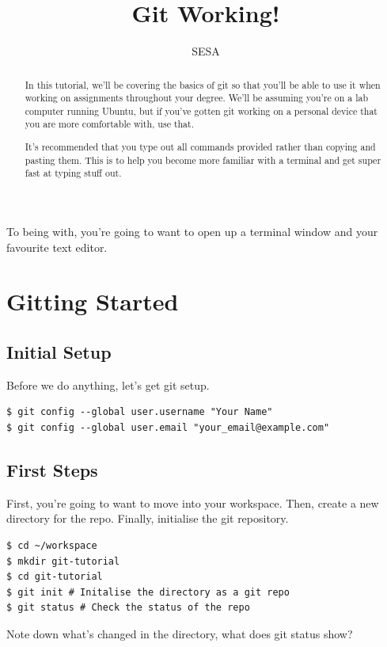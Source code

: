 \documentclass{tufte-handout}
\title{Git Working!}
\author{SESA}
\begin{document}
\maketitle

\begin{abstract}
\noindent In this tutorial, we'll be covering the basics of git so that you'll
be able to use it when working on assignments throughout your degree. We'll be
assuming you're on a lab computer running Ubuntu, but if you've gotten git 
working on a personal device that you are more comfortable with, use that.

\noindent It's recommended that you type out all commands provided rather than copying
and pasting them. This is to help you become more familiar with a terminal and
get super fast at typing stuff out.
\end{abstract}

\noindent To being with, you're going to want to open up a terminal window and your
favourite text editor.

\section{Gitting Started}
\subsection{Initial Setup}

Before we do anything, let's get git setup.

\begin{lstlisting}
$ git config --global user.username "Your Name"
$ git config --global user.email "your_email@example.com"
\end{lstlisting}

\subsection{First Steps}

First, you're going to want to move into your workspace. Then, create a new 
directory for the repo. Finally, initialise the git repository.

\begin{lstlisting}
$ cd ~/workspace
$ mkdir git-tutorial
$ cd git-tutorial
$ git init # Initalise the directory as a git repo
$ git status # Check the status of the repo
\end{lstlisting}

\noindent Note down what's changed in the directory, what does git status show?
\end{document}
